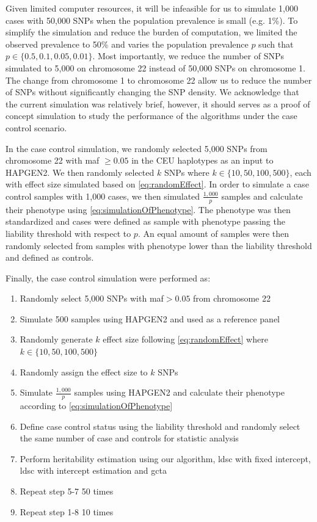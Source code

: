 		Given limited computer resources, it will be infeasible for us to simulate 1,000 cases with 50,000 \glspl{SNP} when the population prevalence is small (e.g. 1\%).
		To simplify the simulation and reduce the burden of computation, we limited the observed prevalence to 50\% and varies the population prevalence $p$ such that $p\in\{0.5, 0.1, 0.05, 0.01\}$.
		Most importantly, we reduce the number of \glspl{SNP} simulated to 5,000 on chromosome 22 instead of 50,000 \glspl{SNP} on chromosome 1. 
		The change from chromosome 1 to chromosome 22 allow us to reduce the number of \glspl{SNP} without significantly changing the \gls{SNP} density. 
		We acknowledge that the current simulation was relatively brief, however, it should serves as a proof of concept simulation to study the performance of the algorithms under the case control scenario.
		
		In the case control simulation, we randomly selected 5,000 \glspl{SNP} from chromosome 22 with \gls{maf} $\ge0.05$ in the \gls{CEU} haplotypes as an input to HAPGEN2. 
		We then randomly selected $k$ \glspl{SNP} where $k\in\{10,50,100,500\}$, each with effect size simulated based on \cref{eq:randomEffect}.
		In order to simulate a case control samples with 1,000 cases, we then simulated $\frac{1,000}{p}$ samples and calculate their phenotype using \cref{eq:simulationOfPhenotype}.
		The phenotype was then standardized and cases were defined as sample with phenotype passing the liability threshold with respect to $p$.
		An equal amount of samples were then randomly selected from samples with phenotype lower than the liability threshold and defined as controls.
			
		Finally, the case control simulation were performed as:
		\begin{enumerate}
			\item Randomly select 5,000 \glspl{SNP} with \gls{maf}$>0.05$ from chromosome 22
			\item Simulate 500 samples using HAPGEN2 and used as a reference panel
			\item Randomly generate $k$ effect size following \cref{eq:randomEffect} where $k\in\{10,50,100,500\}$
			\item Randomly assign the effect size to $k$ \glspl{SNP}
			\item Simulate $\frac{1,000}{p}$ samples using HAPGEN2 and calculate their phenotype according to \cref{eq:simulationOfPhenotype}
			\item Define case control status using the liability threshold and randomly select the same number of case and controls for statistic analysis
			\item Perform heritability estimation using our algorithm, \gls{ldsc} with fixed intercept, \gls{ldsc} with intercept estimation and \gls{gcta}
			\item Repeat step 5-7 50 times
			\item Repeat step 1-8 10 times
		\end{enumerate}
		
